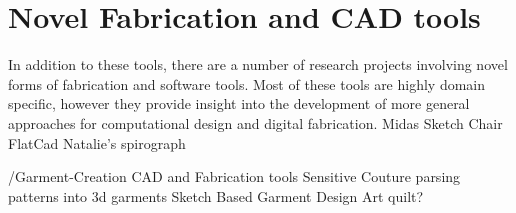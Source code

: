 \section{Novel Fabrication and CAD tools}
In addition to these tools, there are a number of research projects involving novel forms of fabrication and software tools.  Most of these tools are highly domain specific, however they provide insight into the development of more general approaches for computational design and digital fabrication. 
Midas
Sketch Chair
FlatCad
Natalie's spirograph


/Garment-Creation CAD and Fabrication tools
Sensitive Couture
parsing patterns into 3d garments
Sketch Based Garment Design
Art quilt?